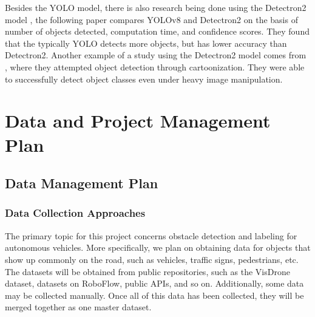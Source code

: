 \documentclass[stu,12pt,floatsintext]{apa7}
\begin{document}
Besides the YOLO model, there is also research being done using the Detectron2 model \parencite{wu2019detectron2}, the following paper \parencite{wadhwa_comparison_2023} compares YOLOv8 and Detectron2 on the basis of number of objects detected, computation time, and confidence scores. They found that the typically YOLO detects more objects, but has lower accuracy than Detectron2. Another example of a study using the Detectron2 model comes from \textcite{abhishek_detectron2_2021}, where they attempted object detection through cartoonization. They were able to successfully detect object classes even under heavy image manipulation.


\section{Data and Project Management Plan}
\subsection{Data Management Plan}
\subsubsection{Data Collection Approaches}
The primary topic for this project concerns obstacle detection and labeling for autonomous vehicles. More specifically, we plan on obtaining data for objects that show up commonly on the road, such as vehicles, traffic signs, pedestrians, etc.
The datasets will be obtained from public repositories, such as the VisDrone dataset, datasets on RoboFlow, public APIs, and so on. Additionally, some data may be collected manually. Once all of this data has been collected, they will be merged together as one master dataset.
\end{document}

